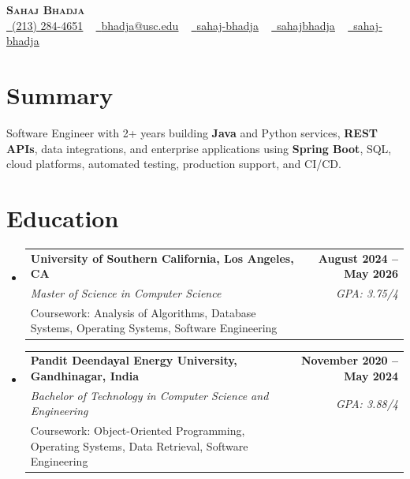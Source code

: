 \documentclass[letterpaper,10pt]{article}
\makeatletter
\newcommand{\sectionGap}{\vspace{-8pt}}
\newcommand{\resumeEduSubheading}[5]{\vspace{-1pt}\item\begin{tabular*}{1.0\textwidth}[t]{l@{\extracolsep{\fill}}r}\textbf{#1} & \textbf{\small #2} \\\textit{\small #3} & \textit{\small #4} \\\small #5 & \\\end{tabular*}\vspace{-4pt}}
\newcommand{\resumeSubHeadingListStart}{\begin{itemize}[leftmargin=0.0in, label={}]}
\newcommand{\resumeSubHeadingListEnd}{\end{itemize}}
\makeatother
\begin{document}
\begin{center}
{\Huge \scshape \textbf{Sahaj Bhadja}} \\ \vspace{1pt}
\small \href{tel:2132844651}{\faPhone\ \underline{(213) 284-4651}} ~ \href{mailto:bhadja@usc.edu}{\raisebox{-0.2\height}\faEnvelope\ \underline{bhadja@usc.edu}} ~
\href{https://www.linkedin.com/in/sahaj-bhadja/}{\raisebox{-0.2\height}\faLinkedin\ \underline{sahaj-bhadja}} ~ \href{https://github.com/SAHAJ-BHADJA}{\raisebox{-0.2\height}\faGithub\ \underline{sahajbhadja}} ~
\href{https://sahaj-bhadja.vercel.app/}{\raisebox{-0.2\height}\faGlobe\ \underline{sahaj-bhadja}}
\end{center}
\vspace{-16pt}
\section{Summary}
\begin{itemize}[leftmargin=0.15in, label={}]
\small{\item{Software Engineer with 2+ years building \textbf{Java} and Python services, \textbf{REST APIs}, data integrations, and enterprise applications using \textbf{Spring Boot}, SQL, cloud platforms, automated testing, production support, and CI/CD.}}
\end{itemize}
\sectionGap
\section{Education}
\resumeSubHeadingListStart
\resumeEduSubheading{University of Southern California, Los Angeles, CA}{August 2024 -- May 2026}{Master of Science in Computer Science}{GPA: 3.75/4}{Coursework: Analysis of Algorithms, Database Systems, Operating Systems, Software Engineering}
\resumeEduSubheading{Pandit Deendayal Energy University, Gandhinagar, India}{November 2020 -- May 2024}{Bachelor of Technology in Computer Science and Engineering}{GPA: 3.88/4}{Coursework: Object-Oriented Programming, Operating Systems, Data Retrieval, Software Engineering}
\resumeSubHeadingListEnd
\sectionGap
\end{document}
